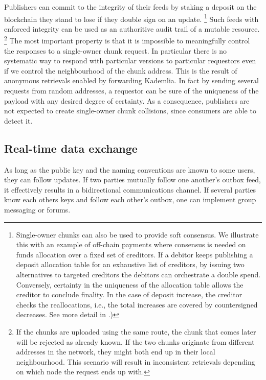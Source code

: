Publishers can commit to the integrity of their feeds by staking a deposit on the blockchain they stand to lose if they double sign on an update.%
%
\footnote{Single-owner chunks can also be used to provide soft consensus. We illustrate this with an example of off-chain payments where consensus is needed on funds allocation over a fixed set of creditors. If a debitor keeps publishing a deposit allocation table for an exhaustive list of creditors, by issuing two alternatives to targeted creditors the debitors can orchestrate a double spend. Conversely, certainty in the uniqueness of the allocation table allows the creditor to conclude finality. In the case of deposit increase, the creditor checks the reallocations, i.e., the total increases are covered by countersigned decreases. See more detail in \cite{tronetal-sw3games}.)}
%
Such feeds with enforced integrity can be used as an authoritive audit trail of a mutable resource.%
%
\footnote{If the chunks are uploaded using the same route, the chunk that comes later will be rejected as already known. If the two chunks originate from different addresses in the network, they might both end up in their local neighbourhood. This scenario will result in inconsistent retrievals depending on which node the request ends up with.}
%
The most important property is that it is impossible to meaningfully control the responses to a single-owner chunk request. In particular there is no systematic way to respond with particular versions to particular requestors even if we control the neighbourhood of the chunk address. This is the result of anonymous retrievals enabled by forwarding Kademlia. In fact by sending several requests from random addresses, a requestor can be sure of the uniqueness of the payload with any desired degree of certainty. 
As a consequence, publishers are not expected to create single-owner chunk collisions, since consumers are able to detect it.  



\subsection{Real-time data exchange}\label{sec:real-time-data-exchange}

As long as the public key and the naming conventions are known to some users, they can follow updates. If two parties mutually follow one another's outbox feed, it effectively results in a bidirectional communications channel. If several parties know each others keys and follow each other's outbox, one can implement group messaging or forums. 


